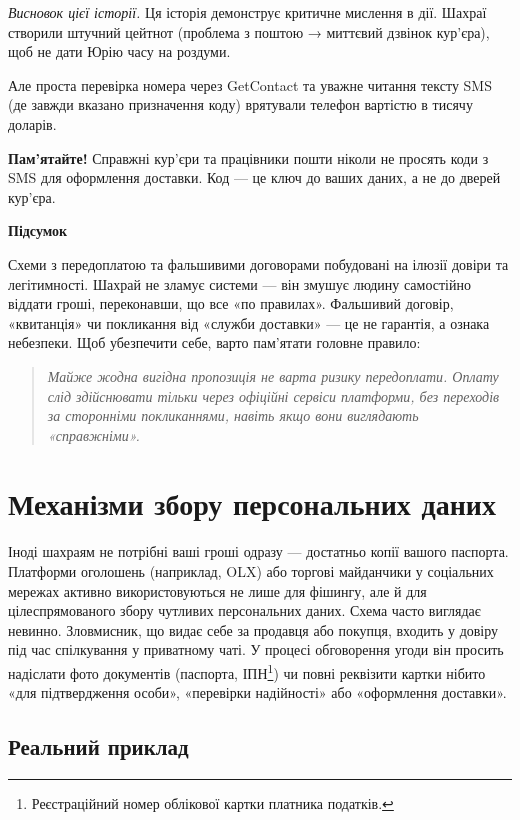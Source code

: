 \textit{Висновок цієї історії.} Ця історія демонструє критичне мислення в дії. Шахраї створили штучний цейтнот (проблема з поштою → миттєвий дзвінок кур'єра), щоб не дати Юрію часу на роздуми. 

\newpage 

Але проста перевірка номера через GetContact та уважне читання тексту SMS (де завжди вказано призначення коду) врятували телефон вартістю в тисячу доларів. 

\textbf{Пам'ятайте!} Справжні кур'єри та працівники пошти ніколи не просять коди з SMS для оформлення доставки. Код — це ключ до ваших даних, а не до дверей кур'єра.

\vspace{0.3cm}\noindent\textbf{Підсумок}

Схеми з передоплатою та фальшивими договорами побудовані на ілюзії довіри та легітимності. Шахрай не зламує системи — він змушує людину самостійно віддати гроші, переконавши, що все «по правилах». Фальшивий договір, «квитанція» чи покликання від «служби доставки» — це не гарантія, а ознака небезпеки. Щоб убезпечити себе, варто пам’ятати головне правило:

\begin{quote}
\textit{{Майже жодна вигідна пропозиція не варта ризику передоплати. Оплату слід здійснювати тільки через офіційні сервіси платформи, без переходів за сторонніми покликаннями, навіть якщо вони виглядають «справжніми».}}
\end{quote}

\chapter{Механізми збору персональних даних}

Іноді шахраям не потрібні ваші гроші одразу — достатньо копії вашого паспорта. Платформи оголошень (наприклад, OLX) або торгові майданчики у соціальних мережах активно використовуються не лише для фішингу, але й для цілеспрямованого збору чутливих персональних даних. Схема часто виглядає невинно. Зловмисник, що видає себе за продавця або покупця, входить у довіру під час спілкування у приватному чаті.  У процесі обговорення угоди він просить надіслати фото документів (паспорта, ІПН\footnote{Реєстраційний номер облікової картки платника податків.}) чи повні реквізити картки нібито «для підтвердження особи», «перевірки надійності» або «оформлення доставки».

\section{Реальний приклад}


